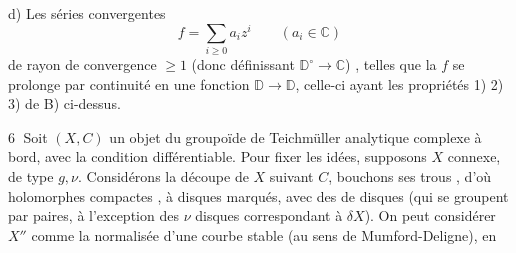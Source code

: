 d) Les séries convergentes
\[
f=\sum_{i\geq0}a_i z^i\qquad(a_i\in\mathbb C)
\]
de rayon de convergence $\geq1$ (donc
définissant $\mathbb D^\circ\longrightarrow\mathbb C$)
, telles que la $f$
se prolonge par continuité en une
fonction $\mathbb D\longrightarrow\mathbb D$, celle-ci ayant les
propriétés 1) 2) 3) de B) ci-dessus.

\textcircled{6}
Soit $(X,C)$ un objet du groupoïde
de Teichmüller analytique complexe
à bord, avec la condition différentiable.
Pour fixer les idées, supposons $X$ connexe,
de type $g,\nu$. Considérons la découpe 
de $X$ suivant $C$, bouchons ses trous
,
d'où  holomorphes compactes , à disques
 marqués, avec des  de  disques
(qui se groupent  par paires, à l'exception
des $\nu$ disques correspondant à $\delta X$).
On peut considérer $X''$ comme la
normalisée d'une courbe  stable
(au sens de Mumford-Deligne), en
